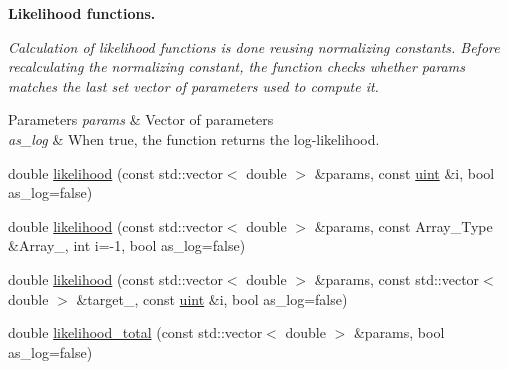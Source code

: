 \begin{Indent}\textbf{ Likelihood functions.}\par
{\em Calculation of likelihood functions is done reusing normalizing constants. Before recalculating the normalizing constant, the function checks whether {\ttfamily params} matches the last set vector of parameters used to compute it.


\begin{DoxyParams}{Parameters}
{\em params} & Vector of parameters \\
\hline
{\em as\+\_\+log} & When {\ttfamily true}, the function returns the log-\/likelihood. \\
\hline
\end{DoxyParams}
}\begin{DoxyCompactItemize}
\item 
double \hyperlink{class_model_ae75fe2213980b6b245e279c7836ab99b}{likelihood} (const std\+::vector$<$ double $>$ \&params, const \hyperlink{typedefs_8hpp_a91ad9478d81a7aaf2593e8d9c3d06a14}{uint} \&i, bool as\+\_\+log=false)
\item 
double \hyperlink{class_model_a147586ed14d850ebab2615c60aa29b80}{likelihood} (const std\+::vector$<$ double $>$ \&params, const Array\+\_\+\+Type \&Array\+\_\+, int i=-\/1, bool as\+\_\+log=false)
\item 
double \hyperlink{class_model_ab88f541fc010f0ee1a415c9cb6c292b7}{likelihood} (const std\+::vector$<$ double $>$ \&params, const std\+::vector$<$ double $>$ \&target\+\_\+, const \hyperlink{typedefs_8hpp_a91ad9478d81a7aaf2593e8d9c3d06a14}{uint} \&i, bool as\+\_\+log=false)
\item 
double \hyperlink{class_model_a31d16ef478d772cedde0813575074a0f}{likelihood\+\_\+total} (const std\+::vector$<$ double $>$ \&params, bool as\+\_\+log=false)
\end{DoxyCompactItemize}
\end{Indent}
